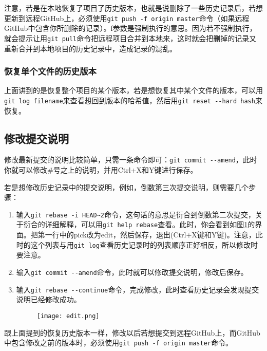 \documentclass[a4paper,12pt]{article}
\begin{document}
注意，若是在本地恢复了项目了历史版本，也就是说删除了一些历史记录后，若想更新到远程GitHub上，必须使用\lstinline|git push -f origin master|命令（如果远程GitHub中包含你所删除的记录）。f参数是强制执行的意思。因为若不强制执行，就会提示让用\lstinline|git pull|命令把远程项目合并到本地来，这时就会把删掉的记录又重新合并到本地项目的历史记录中，造成记录的混乱。

\subsubsection{恢复单个文件的历史版本}

上面讲到的是恢复整个项目的某个版本，若是想恢复其中某个文件的版本，可以用\lstinline|git log filename|来查看想回到版本的哈希值，然后用\lstinline|git reset --hard hash|来恢复。

\subsection{修改提交说明}

修改最新提交的说明比较简单，只需一条命令即可：\lstinline|git commit --amend|，此时你就可以修改\#号之上的说明，并用Ctrl+X和Y键进行保存。

若是想修改历史记录中的提交说明，例如，倒数第三次提交说明，则需要几个步骤：
\begin{enumerate}
\item 输入\lstinline|git rebase -i HEAD~2|命令，这句话的意思是衍合到倒数第二次提交，关于衍合的详细解释，可以用\lstinline|git help rebase|查看。此时，你会看到如图\ref{fig:10}的界面。把第一行中的pick改为edit，然后保存，退出(Ctrl+X键和Y键)。注意，此时的这个列表与用\lstinline|git log|查看历史记录时的列表顺序正好相反，所以修改时要注意。
\item 输入\lstinline|git commit --amend|命令，此时就可以修改提交说明，修改后保存。
\item 输入\lstinline|git rebase --continue|命令，完成修改，此时查看历史记录会发现提交说明已经修改成功。

\begin{figure}[!htb] %
\centering
\texttt{[image: edit.png]}
\caption{}\label{fig:10}
\end{figure}
\end{enumerate}

跟上面提到的恢复历史版本一样，修改以后若想提交到远程GitHub上，而GitHub中包含修改之前的版本时，必须使用\lstinline|git push -f origin master|命令。
\end{document}
